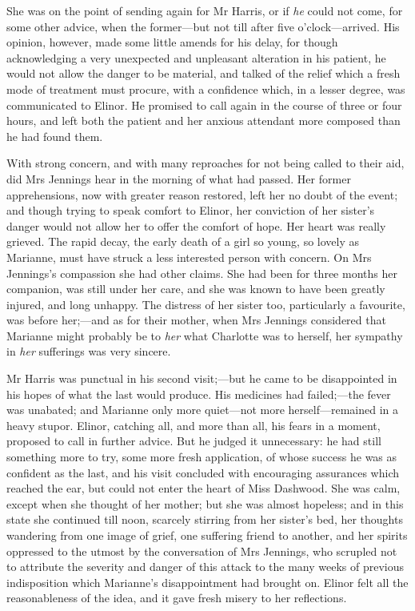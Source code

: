 She was on the point of sending again for Mr Harris, or if \textit{he} could not come, for some other advice, when the former—but not till after five o’clock—arrived. His opinion, however, made some little amends for his delay, for though acknowledging a very unexpected and unpleasant alteration in his patient, he would not allow the danger to be material, and talked of the relief which a fresh mode of treatment must procure, with a confidence which, in a lesser degree, was communicated to Elinor. He promised to call again in the course of three or four hours, and left both the patient and her anxious attendant more composed than he had found them.

With strong concern, and with many reproaches for not being called to their aid, did Mrs Jennings hear in the morning of what had passed. Her former apprehensions, now with greater reason restored, left her no doubt of the event; and though trying to speak comfort to Elinor, her conviction of her sister’s danger would not allow her to offer the comfort of hope. Her heart was really grieved. The rapid decay, the early death of a girl so young, so lovely as Marianne, must have struck a less interested person with concern. On Mrs Jennings’s compassion she had other claims. She had been for three months her companion, was still under her care, and she was known to have been greatly injured, and long unhappy. The distress of her sister too, particularly a favourite, was before her;—and as for their mother, when Mrs Jennings considered that Marianne might probably be to \textit{her} what Charlotte was to herself, her sympathy in \textit{her} sufferings was very sincere.

Mr Harris was punctual in his second visit;—but he came to be disappointed in his hopes of what the last would produce. His medicines had failed;—the fever was unabated; and Marianne only more quiet—not more herself—remained in a heavy stupor. Elinor, catching all, and more than all, his fears in a moment, proposed to call in further advice. But he judged it unnecessary: he had still something more to try, some more fresh application, of whose success he was as confident as the last, and his visit concluded with encouraging assurances which reached the ear, but could not enter the heart of Miss Dashwood. She was calm, except when she thought of her mother; but she was almost hopeless; and in this state she continued till noon, scarcely stirring from her sister’s bed, her thoughts wandering from one image of grief, one suffering friend to another, and her spirits oppressed to the utmost by the conversation of Mrs Jennings, who scrupled not to attribute the severity and danger of this attack to the many weeks of previous indisposition which Marianne’s disappointment had brought on. Elinor felt all the reasonableness of the idea, and it gave fresh misery to her reflections.

